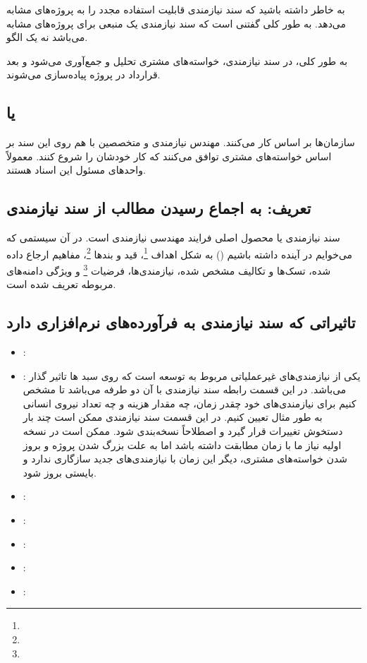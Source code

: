 به خاطر داشته باشید که سند نیازمندی قابلیت استفاده مجدد را به پروژه‌های مشابه
می‌دهد. به طور کلی گفتنی است که سند نیازمندی یک منبعی برای پروژه‌های مشابه
می‌باشد نه یک الگو.

به طور کلی، در سند نیازمندی، خواسته‌های مشتری تحلیل و جمع‌آوری می‌شود و بعد
قرارداد در پروژه پیاده‌سازی می‌شوند.

\subsection{ یا }

سازمان‌ها بر اساس  کار می‌کنند. مهندس نیازمندی و متخصصین با هم روی این
سند بر اساس خواسته‌های مشتری توافق می‌کنند که کار خودشان را شروع کنند. معمولاً
واحد‌های  مسئول این اسناد هستند.

\subsection{تعریف: به اجماع رسیدن مطالب از سند نیازمندی}

سند نیازمندی یا  محصول اصلی فرایند مهندسی نیازمندی است.
در آن سیستمی که می‌خوایم در آینده داشته باشیم () به شکل اهداف
\footnote{}، قید و بند‌ها \footnote{}، مفاهیم
ارجاع داده شده، تسک‌ها و تکالیف مشخص شده، نیازمندی‌ها، فرضیات
\footnote{} و ویژگی دامنه‌های مربوطه تعریف شده است.

\subsection{تاثیراتی که سند نیازمندی به فرآورده‌های نرم‌افزاری دارد}

\begin{itemize}
    \item {}:
    \item {}: یکی از نیازمندی‌های
    غیرعملیاتی مربوط به توسعه است که روی سبد ها تاثیر گذار می‌باشد. در
    این قسمت رابطه سند نیازمندی با آن دو طرفه می‌باشد تا مشخص کنیم برای
    نیازمندی‌های خود چقدر زمان، چه مقدار هزینه و چه تعداد نیروی انسانی به طور
    مثال تعیین کنیم. در این قسمت سند نیازمندی ممکن است چند بار دستخوش تغییرات
    قرار گیرد و اصطلاحاً نسخه‌بندی شود. ممکن است در نسخه اولیه نیاز ما با زمان
    مطابقت داشته باشد اما به علت بزرگ شدن پروژه و بروز شدن خواسته‌های مشتری،
    دیگر این زمان با نیازمندی‌های جدید سازگاری ندارد و بایستی بروز شود.
    \item {}:
    \item {}:
    \item {}:
    \item {}: 
    \item {}:
\end{itemize}

